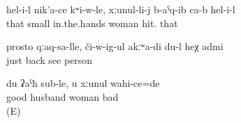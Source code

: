 \begin{exe}
	\ex	\label{ex:While she had the child in her arms, he hit his wife minor}
	\gll	hel-i-l	nik'a-ce	kʷi-w-le,	xːunul-li-j	b-aˁq-ib	ca-b	hel-i-l\\
		that	small	in.the.hands	woman	hit.		that\\
	\glt	{}

	\ex	\label{ex:‎‎Just with the back (turned to me), I do not see this person minor}
	\gll	prosto	qːaq-sa-lle,	či-w-ig-ul	akːʷa-di	du-l	heχ	admi\\
		just	back	see				person\\
	\glt	{}

	\ex	\label{ex:‎While I am a good husband, you are a bad wife minor}
	\gll	du	ʡaˁħ	sub-le,	u	xːunul	wahi-ce=de\\
			good	husband			woman	bad\\
	\glt	{} (E)
\end{exe}
